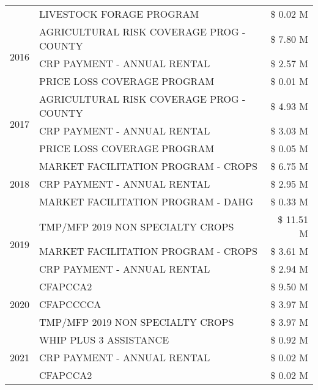 \begin{tabular}{llr}
 & LIVESTOCK FORAGE PROGRAM & \$ 0.02 M \\
\cline{1-3}
\multirow[t]{3}{*}{2016} & AGRICULTURAL RISK COVERAGE PROG - COUNTY      & \$ 7.80 M \\
 & CRP PAYMENT - ANNUAL RENTAL                   & \$ 2.57 M \\
 & PRICE LOSS COVERAGE PROGRAM                   & \$ 0.01 M \\
\cline{1-3}
\multirow[t]{3}{*}{2017} & AGRICULTURAL RISK COVERAGE PROG - COUNTY & \$ 4.93 M \\
 & CRP PAYMENT - ANNUAL RENTAL & \$ 3.03 M \\
 & PRICE LOSS COVERAGE PROGRAM & \$ 0.05 M \\
\cline{1-3}
\multirow[t]{3}{*}{2018} & MARKET FACILITATION PROGRAM - CROPS & \$ 6.75 M \\
 & CRP PAYMENT - ANNUAL RENTAL & \$ 2.95 M \\
 & MARKET FACILITATION PROGRAM - DAHG & \$ 0.33 M \\
\cline{1-3}
\multirow[t]{3}{*}{2019} & TMP/MFP 2019 NON SPECIALTY CROPS & \$ 11.51 M \\
 & MARKET FACILITATION PROGRAM - CROPS & \$ 3.61 M \\
 & CRP PAYMENT - ANNUAL RENTAL & \$ 2.94 M \\
\cline{1-3}
\multirow[t]{3}{*}{2020} & CFAPCCA2 & \$ 9.50 M \\
 & CFAPCCCCA & \$ 3.97 M \\
 & TMP/MFP 2019 NON SPECIALTY CROPS & \$ 3.97 M \\
\cline{1-3}
\multirow[t]{3}{*}{2021} & WHIP PLUS 3 ASSISTANCE & \$ 0.92 M \\
 & CRP PAYMENT - ANNUAL RENTAL & \$ 0.02 M \\
 & CFAPCCA2 & \$ 0.02 M \\
\cline{1-3}
\bottomrule
\end{tabular}
